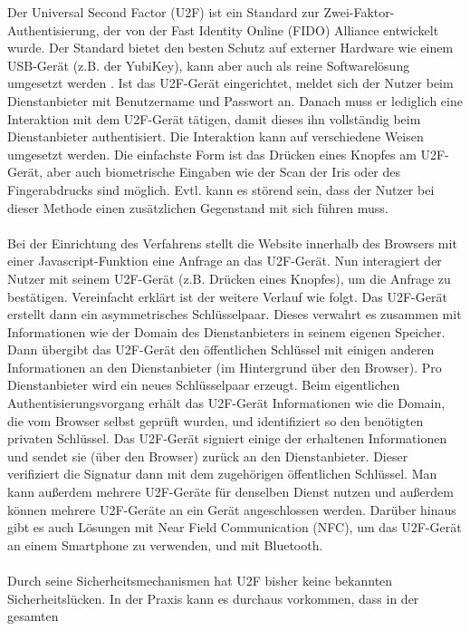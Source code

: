 Der Universal Second Factor (U2F) ist ein Standard zur Zwei-Faktor-Authentisierung, 
der von der Fast Identity Online (FIDO) Alliance entwickelt wurde. Der Standard 
bietet den besten Schutz auf externer Hardware wie einem USB-Gerät (z.B. der 
YubiKey), kann aber auch als reine Softwarelösung umgesetzt werden \autocite[4]{u2f}. Ist 
das U2F-Gerät eingerichtet, meldet sich der Nutzer beim Dienstanbieter mit 
Benutzername und Passwort an. Danach muss er lediglich eine Interaktion mit dem 
U2F-Gerät tätigen, damit dieses ihn vollständig beim Dienstanbieter authentisiert. 
Die Interaktion kann auf verschiedene Weisen umgesetzt werden. Die einfachste Form 
ist das Drücken eines Knopfes am U2F-Gerät, aber auch biometrische Eingaben wie der 
Scan der Iris oder des Fingerabdrucks sind möglich. Evtl. kann es störend sein, dass 
der Nutzer bei dieser Methode einen zusätzlichen Gegenstand mit sich führen muss.
\\\\
Bei der Einrichtung des Verfahrens stellt die Website innerhalb des Browsers mit 
einer Javascript-Funktion eine Anfrage an das U2F-Gerät. Nun interagiert der Nutzer 
mit seinem U2F-Gerät (z.B. Drücken eines Knopfes), um die Anfrage zu bestätigen. 
Vereinfacht erklärt ist der weitere Verlauf wie folgt. Das U2F-Gerät erstellt dann 
ein asymmetrisches Schlüsselpaar. Dieses verwahrt es zusammen mit Informationen wie 
der Domain des Dienstanbieters in seinem eigenen Speicher. Dann übergibt das 
U2F-Gerät den öffentlichen Schlüssel mit einigen anderen Informationen an den 
Dienstanbieter (im Hintergrund über den Browser). Pro Dienstanbieter wird ein neues 
Schlüsselpaar erzeugt. Beim eigentlichen Authentisierungsvorgang erhält das 
U2F-Gerät Informationen wie die Domain, die vom Browser selbst geprüft wurden, und 
identifiziert so den benötigten privaten Schlüssel. Das U2F-Gerät signiert einige 
der erhaltenen Informationen und sendet sie (über den Browser) zurück an den 
Dienstanbieter. Dieser verifiziert die Signatur dann mit dem zugehörigen 
öffentlichen Schlüssel. Man kann außerdem mehrere U2F-Geräte für denselben Dienst 
nutzen und außerdem können mehrere U2F-Geräte an ein Gerät angeschlossen werden. 
Darüber hinaus gibt es auch Lösungen mit Near Field Communication (NFC), um das 
U2F-Gerät an einem Smartphone zu verwenden, und mit Bluetooth. \autocite{u2f}
\\\\
Durch seine Sicherheitsmechanismen hat U2F bisher keine bekannten 
Sicherheitslücken. In der Praxis kann es durchaus vorkommen, dass in der gesamten 
